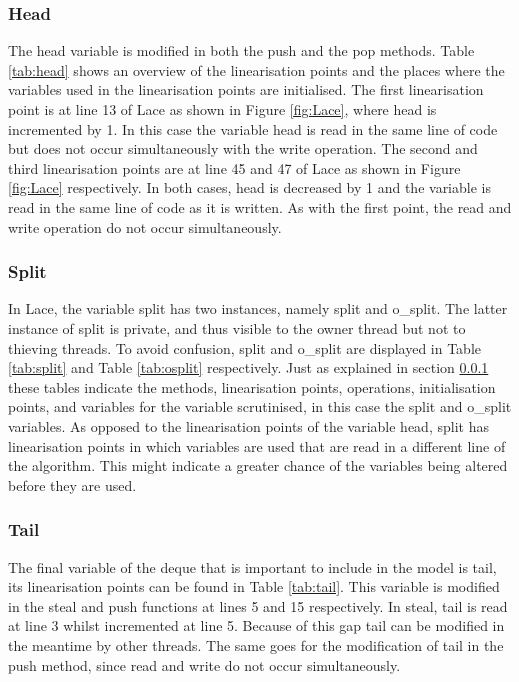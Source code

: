 \documentclass{sig-alternate-br}
\begin{document}
\subsubsection{Head}
\label{sec:head}
The head variable is modified in both the push and the pop methods.
Table \ref{tab:head} shows an overview of the linearisation points and the places where the variables used in the linearisation points are initialised.
The first linearisation point is at line 13 of Lace as shown in Figure \ref{fig:Lace}, where head is incremented by 1.
In this case the variable head is read in the same line of code but does not occur simultaneously with the write operation.
The second and third linearisation points are at line 45 and 47 of Lace as shown in Figure \ref{fig:Lace} respectively.
In both cases, head is decreased by 1 and the variable is read in the same line of code as it is written.
As with the first point, the read and write operation do not occur simultaneously.

\subsubsection{Split}
In Lace, the variable split has two instances, namely split and o\_split.
The latter instance of split is private, and thus visible to the owner thread but not to thieving threads.
To avoid confusion, split and o\_split are displayed in Table \ref{tab:split} and Table \ref{tab:osplit} respectively.
Just as explained in section \ref{sec:head} these tables indicate the methods, linearisation points, operations, initialisation points, and variables for the variable scrutinised, in this case the split and o\_split variables.
As opposed to the linearisation points of the variable head, split has linearisation points in which variables are used that are read in a different line of the algorithm.
This might indicate a greater chance of the variables being altered before they are used.

\subsubsection{Tail}
The final variable of the deque that is important to include in the model is tail, its linearisation points can be found in Table \ref{tab:tail}.
This variable is modified in the steal and push functions at lines 5 and 15 respectively.
In steal, tail is read at line 3 whilst incremented at line 5.
Because of this gap tail can be modified in the meantime by other threads.
The same goes for the modification of tail in the push method, since read and write do not occur simultaneously.
\end{document}
